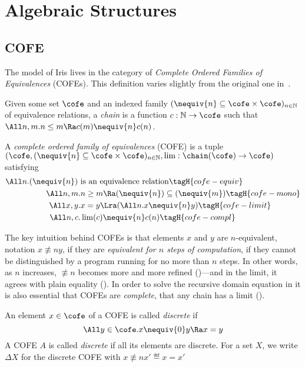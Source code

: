 \section{Algebraic Structures}

\subsection{COFE}

The model of Iris lives in the category of \emph{Complete Ordered Families of Equivalences} (COFEs).
This definition varies slightly from the original one in~\cite{catlogic}.

\begin{defn}[Chain]
  Given some set $\cofe$ and an indexed family $({\nequiv{n}} \subseteq \cofe \times \cofe)_{n \in \mathbb{N}}$ of equivalence relations, a \emph{chain} is a function $c : \mathbb{N} \to \cofe$ such that $\All n, m. n \leq m \Ra c (m) \nequiv{n} c (n)$.
\end{defn}

\begin{defn}
  A \emph{complete ordered family of equivalences} (COFE) is a tuple $(\cofe, ({\nequiv{n}} \subseteq \cofe \times \cofe)_{n \in \mathbb{N}}, \lim : \chain(\cofe) \to \cofe)$ satisfying
  \begin{align*}
    \All n. (\nequiv{n}) ~& \text{is an equivalence relation} \tagH{cofe-equiv} \\
    \All n, m.& n \geq m \Ra (\nequiv{n}) \subseteq (\nequiv{m}) \tagH{cofe-mono} \\
    \All x, y.& x = y \Lra (\All n. x \nequiv{n} y) \tagH{cofe-limit} \\
    \All n, c.& \lim(c) \nequiv{n} c(n) \tagH{cofe-compl}
  \end{align*}
\end{defn}

The key intuition behind COFEs is that elements $x$ and $y$ are $n$-equivalent, notation $x \nequiv{n} y$, if they are \emph{equivalent for $n$ steps of computation}, \ie if they cannot be distinguished by a program running for no more than $n$ steps.
In other words, as $n$ increases, $\nequiv{n}$ becomes more and more refined ()---and in the limit, it agrees with plain equality ().
In order to solve the recursive domain equation in  it is also essential that COFEs are \emph{complete}, \ie that any chain has a limit ().

\begin{defn}
  An element $x \in \cofe$ of a COFE is called \emph{discrete} if
  \[ \All y \in \cofe. x \nequiv{0} y \Ra x = y\]
  A COFE $A$ is called \emph{discrete} if all its elements are discrete.
  For a set $X$, we write $\Delta X$ for the discrete COFE with $x \nequiv{n} x' \eqdef x = x'$

\end{defn}

